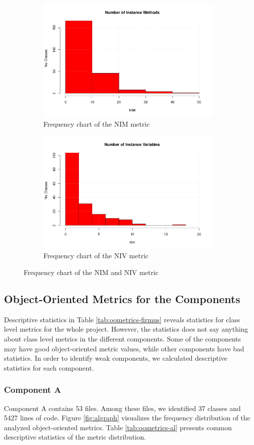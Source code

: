 \begin{figure}[!tbp]
\centering
\begin{subfigure}{\textwidth}
	\centering
	\includegraphics[width=.5\textwidth]{images/NIM.png}
	\caption{Frequency chart of the NIM metric}
	\label{fig:nimdistrubition}
\end{subfigure}
\begin{subfigure}{\textwidth}
	\centering
	\includegraphics[width=.5\textwidth]{images/NIV.png}
	\caption{Frequency chart of the NIV metric}
	\label{fig:nivdistrubtion}
\end{subfigure}
\caption{Frequency chart of the NIM and NIV metric}
\end{figure}



\subsection{Object-Oriented Metrics for the Components}
Descriptive statistics in Table \ref{tab:oometrics-firmus} reveals statistics for class level metrics for the whole project. However, the statistics does not say anything about class level metrics in the different components. Some of the components may have good object-oriented metric values, while other components have bad statistics. In order to identify weak components, we calculated descriptive statistics for each component. 

\subsubsection{Component A}
Component A contains 53 files. Among these files, we identified 37 classes and 5427 lines of code. Figure \ref{fig:algraph} visualizes the frequency distribution of the analyzed object-oriented metrics. Table \ref{tab:oometrics-al} presents common descriptive statistics of the metric distribution.


